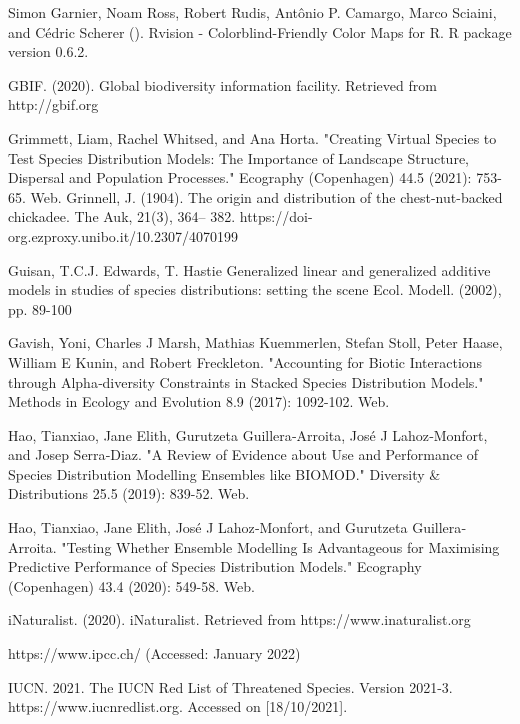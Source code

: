 \documentclass[12pt,a4paper]{article}
\begin{document}
\begin{thebibliography}{999}
Simon Garnier, Noam Ross, Robert Rudis, Antônio P. Camargo, Marco Sciaini, and Cédric Scherer (). Rvision - Colorblind-Friendly Color Maps for R. R package version 0.6.2.

GBIF. (2020). Global biodiversity information facility. Retrieved from http://gbif.org


Grimmett, Liam, Rachel Whitsed, and Ana Horta. "Creating Virtual Species to Test Species Distribution Models: The Importance of Landscape Structure, Dispersal and Population Processes." Ecography (Copenhagen) 44.5 (2021): 753-65. Web.
Grinnell, J. (1904). The origin and distribution of the chest-nut-backed chickadee. The Auk, 21(3), 364– 382. https://doi-org.ezproxy.unibo.it/10.2307/4070199

Guisan, T.C.J. Edwards, T. Hastie
Generalized linear and generalized additive models in studies of species distributions: setting the scene
Ecol. Modell. (2002), pp. 89-100

Gavish, Yoni, Charles J Marsh, Mathias Kuemmerlen, Stefan Stoll, Peter Haase, William E Kunin, and Robert Freckleton. "Accounting for Biotic Interactions through Alpha‐diversity Constraints in Stacked Species Distribution Models." Methods in Ecology and Evolution 8.9 (2017): 1092-102. Web.


Hao, Tianxiao, Jane Elith, Gurutzeta Guillera‐Arroita, José J Lahoz‐Monfort, and Josep Serra‐Diaz. "A Review of Evidence about Use and Performance of Species Distribution Modelling Ensembles like BIOMOD." Diversity & Distributions 25.5 (2019): 839-52. Web.

Hao, Tianxiao, Jane Elith, José J Lahoz‐Monfort, and Gurutzeta Guillera‐Arroita. "Testing Whether Ensemble Modelling Is Advantageous for Maximising Predictive Performance of Species Distribution Models." Ecography (Copenhagen) 43.4 (2020): 549-58. Web.

iNaturalist. (2020). iNaturalist. Retrieved from https://www.inaturalist.org

https://www.ipcc.ch/ (Accessed: January 2022)

IUCN. 2021. The IUCN Red List of Threatened Species. Version 2021-3. https://www.iucnredlist.org. Accessed on [18/10/2021].


\end{thebibliography}
\end{document}
